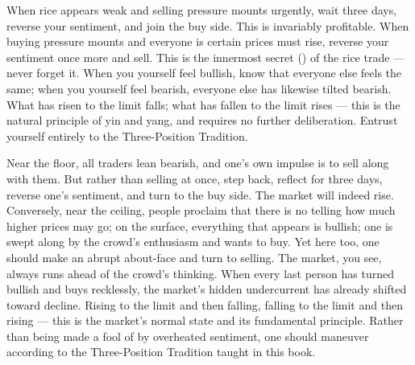 \begin{sokyubox}
{\small\itshape\color{sokyubar} }

\medskip
When rice appears weak and selling pressure mounts urgently, wait
three days, reverse your sentiment, and join the buy side. This is
invariably profitable. When buying pressure mounts and everyone is
certain prices must rise, reverse your sentiment once more and sell.
This is the innermost secret () of the rice trade ---
never forget it. When you yourself feel bullish, know that everyone
else feels the same; when you yourself feel bearish, everyone else
has likewise tilted bearish. What has risen to the limit falls; what
has fallen to the limit rises --- this is the natural principle of
yin and yang, and requires no further deliberation. Entrust yourself
entirely to the Three-Position Tradition.
\end{sokyubox}

\commentary
Near the floor, all traders lean bearish, and one's own impulse is
to sell along with them. But rather than selling at once, step back,
reflect for three days, reverse one's sentiment, and turn to the
buy side. The market will indeed rise. Conversely, near the ceiling,
people proclaim that there is no telling how much higher prices may
go; on the surface, everything that appears is bullish; one is
swept along by the crowd's enthusiasm and wants to buy. Yet here
too, one should make an abrupt about-face and turn to selling. The
market, you see, always runs ahead of the crowd's thinking. When
every last person has turned bullish and buys recklessly, the
market's hidden undercurrent has already shifted toward decline.
Rising to the limit and then falling, falling to the limit and then
rising --- this is the market's normal state and its fundamental
principle. Rather than being made a fool of by overheated sentiment,
one should maneuver according to the Three-Position Tradition taught
in this book.


